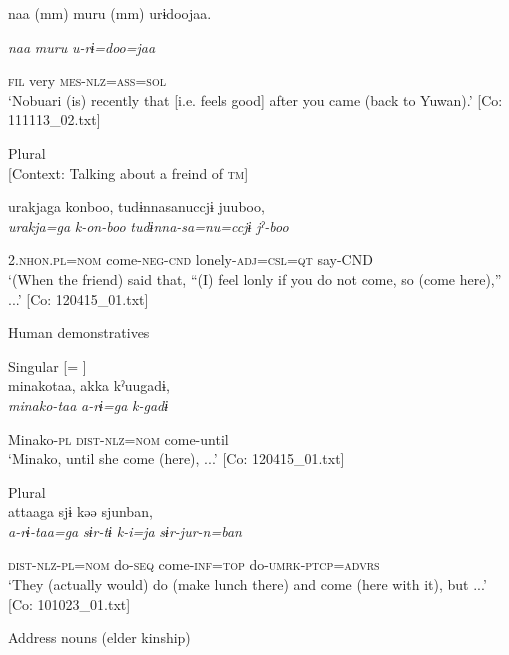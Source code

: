 \begin{table}
      naa  (mm)  muru  (mm)  urɨdoojaa.

      \textit{naa}    \textit{muru}    \textit{u-rɨ=doo=jaa}

      \textsc{fil}    very    \textsc{mes}-\textsc{nlz}=\textsc{ass}=\textsc{sol}\\
\glt ‘Nobuari (is) recently that [i.e. feels good] after you came (back to Yuwan).’ [Co: 111113\_02.txt]
\z

\ex  Plural\\

    [Context: Talking about a freind of \textsc{tm}]

{\TM}
\glll urakjaga  konboo,  tudɨnnasanuccjɨ  juuboo,\\

      \textit{urakja=ga}  \textit{k-on-boo}  \textit{tudɨnna-sa=nu=ccjɨ}  \textit{jˀ-boo}

      2.\textsc{nhon}.\textsc{pl}=\textsc{nom}  come-\textsc{neg}-\textsc{cnd}  lonely-\textsc{adj}=\textsc{csl}=\textsc{qt}  say-CND\\
\glt ‘(When the friend) said that, “(I) feel lonly if you do not come, so (come here),” ...’ [Co: 120415\_01.txt]
\z

  Human demonstratives

\ex  Singular [= ]\\

{\TM}
\glll minakotaa,  akka  kˀuugadɨ,\\

      \textit{minako-taa}  \textit{a-rɨ=ga}  \textit{k-gadɨ}

      Minako-\textsc{pl}  \textsc{dist}-\textsc{nlz}=\textsc{nom}  come-until\\
\glt ‘Minako, until she come (here), ...’ [Co: 120415\_01.txt]
\z

\ex  Plural\\

{\TM}
\glll attaaga  sjɨ  kəə  sjunban,\\

      \textit{a-rɨ-taa=ga}  \textit{sɨr-tɨ}  \textit{k-i=ja}  \textit{sɨr-jur-n=ban}

      \textsc{dist}-\textsc{nlz}-\textsc{pl}=\textsc{nom}  do-\textsc{seq}  come-\textsc{inf}=\textsc{top}  do-\textsc{umrk}-\textsc{ptcp}=\textsc{advrs}\\
\glt ‘They (actually would) do (make lunch there) and come (here with it), but ...’ [Co: 101023\_01.txt]
\z

  Address nouns (elder kinship)


\end{table}
